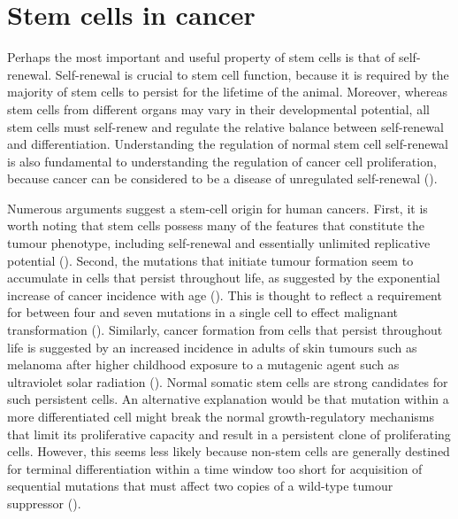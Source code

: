 \documentclass[
  letterpaper,
]{scrreprt}
\theoremstyle{definition}
\theoremstyle{remark}
\begin{document}
\section{Stem cells in cancer}\label{sec-stem-cells-in-cancer}

Perhaps the most important and useful property of stem cells is that of
self-renewal. Self-renewal is crucial to stem cell function, because it
is required by the majority of stem cells to persist for the lifetime of
the animal. Moreover, whereas stem cells from different organs may vary
in their developmental potential, all stem cells must self-renew and
regulate the relative balance between self-renewal and differentiation.
Understanding the regulation of normal stem cell self-renewal is also
fundamental to understanding the regulation of cancer cell
proliferation, because cancer can be considered to be a disease of
unregulated self-renewal ().

Numerous arguments suggest a stem-cell origin for human cancers. First,
it is worth noting that stem cells possess many of the features that
constitute the tumour phenotype, including self-renewal and essentially
unlimited replicative potential (). Second, the mutations that initiate tumour formation
seem to accumulate in cells that persist throughout life, as suggested
by the exponential increase of cancer incidence with age
(). This is thought to reflect
a requirement for between four and seven mutations in a single cell to
effect malignant transformation (). Similarly, cancer formation from cells that persist
throughout life is suggested by an increased incidence in adults of skin
tumours such as melanoma after higher childhood exposure to a mutagenic
agent such as ultraviolet solar radiation (). Normal somatic stem cells are strong candidates for such
persistent cells. An alternative explanation would be that mutation
within a more differentiated cell might break the normal
growth-regulatory mechanisms that limit its proliferative capacity and
result in a persistent clone of proliferating cells. However, this seems
less likely because non-stem cells are generally destined for terminal
differentiation within a time window too short for acquisition of
sequential mutations that must affect two copies of a wild-type tumour
suppressor ().
\end{document}
